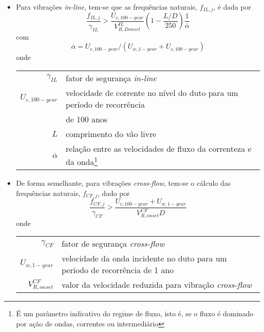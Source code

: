 \begin{itemize}
	\item Para vibrações \textit{in-line}, tem-se que as frequências naturais, $f_{\mathit{IL},j}$, é dada por
	\begin{equation}
	\label{eq:jdsn-eqil}
	\frac{f_{\mathit{IL},j}}{\gamma_\mathit{IL}} > \frac{U_{c,100-\mathit{year}}}{V_{R, D \mathit{onset}}^\mathit{IL}} \left( 1 - \frac{L/D}{250}\right) \frac{1}{\overline{\alpha}}
	\end{equation}
	com
	\begin{equation}
	\overline{\alpha} = {U_{c,100-\mathit{year}}}/{(U_{w,1-\mathit{year}} + U_{c,100-\mathit{year}})}
	\end{equation}
	onde
	
	\begin{tabular}{rl}
		$\gamma_\mathit{IL}$      & fator de segurança \textit{in-line}\\
		$U_{c,100-\mathit{year}}$ & velocidade de corrente no nível do duto para um período de recorrência \\
		                          & de 100 anos\\
		$L$                       & comprimento do vão livre\\
		$\overline{\alpha}$       & relação entre as velocidades de fluxo da correnteza e da onda\footnote{É um parâmetro indicativo do regime de fluxo, isto é, se o fluxo é dominado por ação de ondas, correntes ou intermediário}
	\end{tabular}

	\item De forma semelhante, para vibrações \textit{cross-flow}, tem-se o cálculo das frequências naturais, $f_{\mathit{CF},j}$, dado por
	\begin{equation}
	\label{eq:jdsn-eqcf}
	\frac{f_{\mathit{CF},j}}{\gamma_\mathit{CF}} > \frac{U_{c,100-\mathit{year}} + U_{w,1-\mathit{year}}}{ V_{R,\mathit{onset}}^{\mathit{CF}} D}
	\end{equation}
	onde
	
	\begin{tabular}{rl}
		$\gamma_\mathit{CF}$               & fator de segurança \textit{cross-flow}\\
		$U_{w,1-\mathit{year}}$            & velocidade da onda incidente no duto para um período de recorrência de 1 ano\\
		$V_{R,\mathit{onset}}^\mathit{CF}$ & valor da velocidade reduzida para vibração \textit{cross-flow}
	\end{tabular}
\end{itemize}

